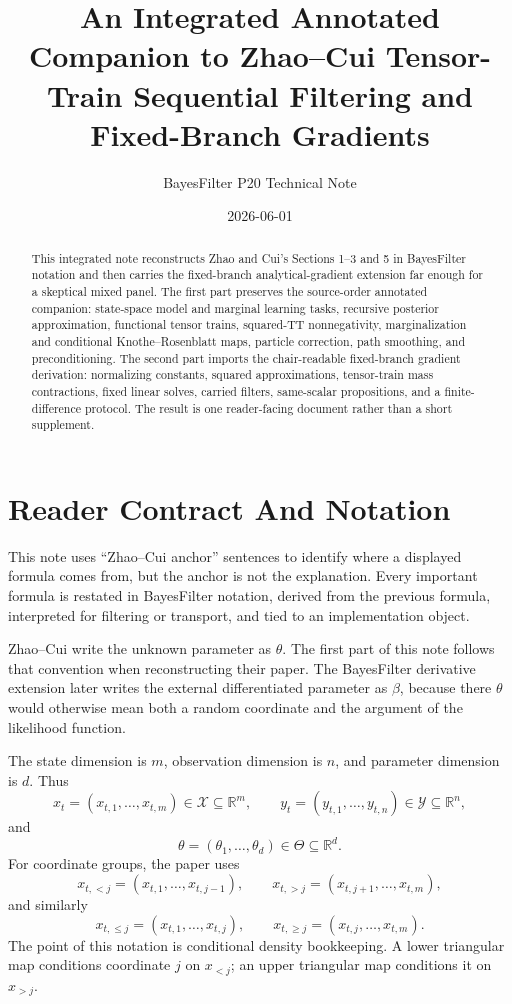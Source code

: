 \documentclass[11pt]{article}
\title{An Integrated Annotated Companion to Zhao--Cui Tensor-Train Sequential Filtering and Fixed-Branch Gradients}
\author{BayesFilter P20 Technical Note}
\date{2026-06-01}
\newcommand{\R}{\mathbb R}
\begin{document}
\maketitle

\begin{abstract}
This integrated note reconstructs Zhao and Cui's Sections 1--3 and 5 in
BayesFilter notation and then carries the fixed-branch analytical-gradient
extension far enough for a skeptical mixed panel.  The first part preserves the
source-order annotated companion: state-space model and marginal learning
tasks, recursive posterior approximation, functional tensor trains,
squared-TT nonnegativity, marginalization and conditional Knothe--Rosenblatt
maps, particle correction, path smoothing, and preconditioning.  The second
part imports the chair-readable fixed-branch gradient derivation: normalizing
constants, squared approximations, tensor-train mass contractions, fixed linear
solves, carried filters, same-scalar propositions, and a finite-difference
protocol.  The result is one reader-facing document rather than a short
supplement.
\end{abstract}

\tableofcontents

\section{Reader Contract And Notation}

This note uses ``Zhao--Cui anchor'' sentences to identify where a displayed
formula comes from, but the anchor is not the explanation.  Every important
formula is restated in BayesFilter notation, derived from the previous
formula, interpreted for filtering or transport, and tied to an implementation
object.

Zhao--Cui write the unknown parameter as \(\theta\).  The first part of this
note follows that convention when reconstructing their paper.  The
BayesFilter derivative extension later writes the external differentiated
parameter as \(\beta\), because there \(\theta\) would otherwise mean both a
random coordinate and the argument of the likelihood function.

The state dimension is \(m\), observation dimension is \(n\), and parameter
dimension is \(d\).  Thus
\[
    x_t=(x_{t,1},\ldots,x_{t,m})\in\mathcal X\subseteq\R^m,
    \qquad
    y_t=(y_{t,1},\ldots,y_{t,n})\in\mathcal Y\subseteq\R^n,
\]
and
\[
    \theta=(\theta_1,\ldots,\theta_d)\in\Theta\subseteq\R^d.
\]
For coordinate groups, the paper uses
\[
    x_{t,<j}=(x_{t,1},\ldots,x_{t,j-1}),\qquad
    x_{t,>j}=(x_{t,j+1},\ldots,x_{t,m}),
    \tag{N1}
\]
and similarly
\[
    x_{t,\le j}=(x_{t,1},\ldots,x_{t,j}),\qquad
    x_{t,\ge j}=(x_{t,j},\ldots,x_{t,m}).
    \tag{N2}
\]
The point of this notation is conditional density bookkeeping.  A lower
triangular map conditions coordinate \(j\) on \(x_{<j}\); an upper triangular
map conditions it on \(x_{>j}\).
\end{document}
